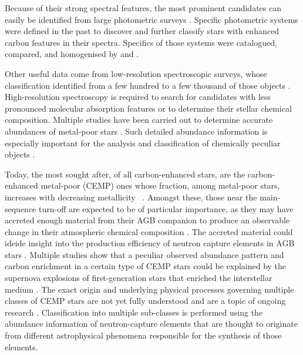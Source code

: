 Because of their strong spectral features, the most prominent candidates can easily be identified from large photometric surveys \cite{2002AJ....124.1651M, 2004AJ....127.2838D}. Specific photometric systems \cite{1960MNRAS.120..287G, 1968AJ.....73..313M, 1970A&AS....1..199H} were defined in the past to discover and further classify stars with enhanced carbon features in their spectra. Specifics of those systems were catalogued, compared, and homogenised by \citet{2000A&AS..147..361M} and \citet{2003A&A...401..781F}.

Other useful data come from low-resolution spectroscopic surveys, whose classification identified from a few hundred to a few thousand of those objects \cite{2001A&A...375..366C, 2013ApJ...765...12G, 2013AJ....146..132L, 2016ApJS..226....1J, 2018ApJS..234...31L}. High-resolution spectroscopy is required to search for candidates with less pronounced molecular absorption features or to determine their stellar chemical composition. Multiple studies have been carried out to determine accurate abundances of metal-poor stars \cite{1997ApJ...488..350N, 2002ApJ...567.1166A, 2004A&A...416.1117C, 2005ESASP.560..433B, 2006AJ....132..137C, 2007ApJ...655..492A, 2007ApJ...670..774N, 2011ApJ...742...54H, 2013ApJ...762...26Y, 2014AJ....147..136R, 2015ApJ...807..173H, 2015ApJ...807..171J}. Such detailed abundance information is especially important for the analysis and classification of chemically peculiar objects \cite{2013ApJ...778...56C}.

Today, the most sought after, of all carbon-enhanced stars, are the carbon-enhanced metal-poor (CEMP) ones whose fraction, among metal-poor stars, increases with decreasing metallicity \Meh\ \cite{1992AJ....103.1987B, 1997ApJ...488..350N, 1999ASPC..165..264R, 2005ApJ...633L.109C, 2005ApJ...625..825L, 2005AJ....130.2804R, 2006ApJ...652.1585F, 2007PhDT........22M, 2012ApJ...744..195C, 2013AJ....146..132L, 2013ApJ...762...27Y,  2014ApJ...797...21P, 2018ApJ...861..146Y}. Amongst these, those near the main-sequence turn-off are expected to be of particular importance, as they may have accreted enough material from their AGB companion to produce an observable change in their atmospheric chemical composition \cite{2004ApJ...611..476S, 2014MNRAS.441.1217S, 2015ApJ...807..173H}. The accreted material could ideide insight into the production efficiency of neutron capture elements in AGB stars \cite{2007ApJ...655..492A}. Multiple studies show that a peculiar observed abundance pattern and carbon enrichment in a certain type of CEMP stars could be explained by the supernova explosions of first-generation stars that enriched the interstellar medium \cite{2003Natur.422..871U, 2005ApJ...619..427U, 2014ApJ...785...98T, 2018MNRAS.tmp.2127B}. The exact origin and underlying physical processes governing multiple classes of CEMP stars are not yet fully understood and are a topic of ongoing research \cite{2014ApJ...788..180C, 2016ApJ...833...20Y, 2018MNRAS.475.4781C}. Classification into multiple sub-classes is performed using the abundance information of neutron-capture elements \cite{2005ARA&A..43..531B, 2013A&A...552A.107S, 2015ApJ...814..121H, 2016ApJ...833...20Y} that are thought to originate from different astrophysical phenomena responsible for the synthesis of those elements.

